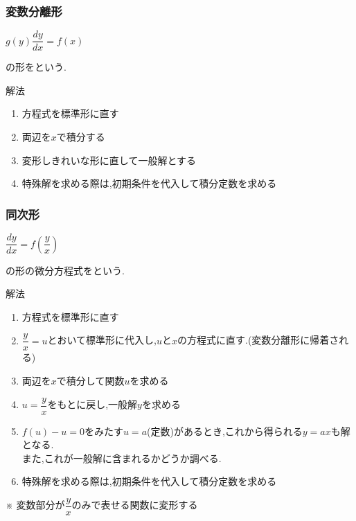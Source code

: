 \documentclass[a4paper]{jsarticle}
\begin{document}
\subsubsection{変数分離形}
\begin{center}
    $g\left(y\right)\dfrac{dy}{dx}=f\left(x\right)$
\end{center}
の形をという.
\begin{itembox}[l]{解法}
    \begin{enumerate}[(1)]
        \item 方程式を標準形に直す
        \item 両辺を$x$で積分する
        \item 変形しきれいな形に直して一般解とする
        \item 特殊解を求める際は,初期条件を代入して積分定数を求める
    \end{enumerate}
\end{itembox}
\subsubsection{同次形}
\begin{center}
    $\dfrac{dy}{dx}=f\left(\dfrac{y}{x}\right)$
\end{center}
の形の微分方程式をという.
\begin{itembox}[l]{解法}
    \begin{enumerate}[(1)]
        \item 方程式を標準形に直す
        \item $\dfrac{y}{x}=u$とおいて標準形に代入し,$u$と$x$の方程式に直す.\quad(変数分離形に帰着される)
        \item 両辺を$x$で積分して関数$u$を求める
        \item $u=\dfrac{y}{x}$をもとに戻し,一般解$y$を求める
        \item $f\left(u\right)-u=0$をみたす$u=a$(定数)があるとき,これから得られる$y=ax$も解となる.\\
              また,これが一般解に含まれるかどうか調べる.
        \item 特殊解を求める際は,初期条件を代入して積分定数を求める
    \end{enumerate}
    ※ 変数部分が$\dfrac{y}{x}$のみで表せる関数に変形する\\
\end{itembox}
\end{document}
